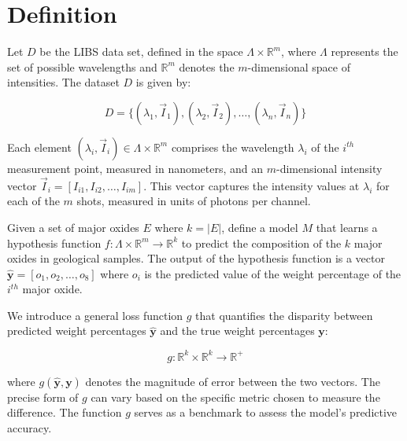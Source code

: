 \section{Definition}\label{sec:definition}
Let $D$ be the LIBS data set, defined in the space $\Lambda \times \mathbb{R}^m$, where $\Lambda$ represents the set of possible wavelengths and $\mathbb{R}^m$ denotes the $m$-dimensional space of intensities.
The dataset $D$ is given by:

\begin{equation}
    D = \{ (\lambda_1, \vec{I}_1), (\lambda_2, \vec{I}_2), \ldots, (\lambda_n, \vec{I}_n) \}
\end{equation}

Each element $(\lambda_i, \vec{I}_i) \in \Lambda \times \mathbb{R}^{m}$ comprises the wavelength $\lambda_i$ of the $i^{th}$ measurement point, measured in nanometers, and an $m$-dimensional intensity vector $\vec{I}_i = [I_{i1}, I_{i2}, \ldots, I_{im}]$.
This vector captures the intensity values at $\lambda_i$ for each of the $m$ shots, measured in units of photons per channel.

Given a set of major oxides $E$ where $k=|E|$, define a model $M$ that learns a hypothesis function $f: \Lambda \times \mathbb{R}^m \rightarrow \mathbb{R}^k$ to predict the composition of the $k$ major oxides in geological samples.
The output of the hypothesis function is a vector $\mathbf{\hat{y}} = [o_{1}, o_{2}, \ldots, o_{8}]$ where $o_{i}$ is the predicted value of the weight percentage of the $i^{th}$ major oxide.

We introduce a general loss function $g$ that quantifies the disparity between predicted weight percentages $\mathbf{\hat{y}}$ and the true weight percentages $\mathbf{y}$:

\begin{equation}
g: \mathbb{R}^k \times \mathbb{R}^k \rightarrow \mathbb{R}^+
\end{equation}

where $g(\mathbf{\hat{y}}, \mathbf{y})$ denotes the magnitude of error between the two vectors.
The precise form of $g$ can vary based on the specific metric chosen to measure the difference. The function $g$ serves as a benchmark to assess the model's predictive accuracy.

